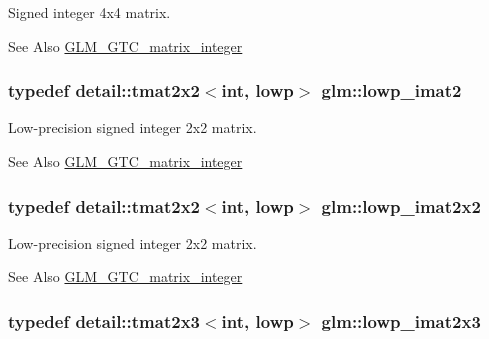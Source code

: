 Signed integer 4x4 matrix. \begin{DoxySeeAlso}{See Also}
\hyperlink{group__gtc__matrix__integer}{G\-L\-M\-\_\-\-G\-T\-C\-\_\-matrix\-\_\-integer} 
\end{DoxySeeAlso}
\hypertarget{group__gtc__matrix__integer_gae0df4bc278c1a958a32af9ac82c47630}{
\subsubsection[{lowp\-\_\-imat2}]{\setlength{\rightskip}{0pt plus 5cm}typedef detail\-::tmat2x2$<$int, lowp$>$ {\bf glm\-::lowp\-\_\-imat2}}}\label{group__gtc__matrix__integer_gae0df4bc278c1a958a32af9ac82c47630}
Low-\/precision signed integer 2x2 matrix. \begin{DoxySeeAlso}{See Also}
\hyperlink{group__gtc__matrix__integer}{G\-L\-M\-\_\-\-G\-T\-C\-\_\-matrix\-\_\-integer} 
\end{DoxySeeAlso}
\hypertarget{group__gtc__matrix__integer_ga05307630bc68a62132a82d1886a0b5e2}{
\subsubsection[{lowp\-\_\-imat2x2}]{\setlength{\rightskip}{0pt plus 5cm}typedef detail\-::tmat2x2$<$int, lowp$>$ {\bf glm\-::lowp\-\_\-imat2x2}}}\label{group__gtc__matrix__integer_ga05307630bc68a62132a82d1886a0b5e2}
Low-\/precision signed integer 2x2 matrix. \begin{DoxySeeAlso}{See Also}
\hyperlink{group__gtc__matrix__integer}{G\-L\-M\-\_\-\-G\-T\-C\-\_\-matrix\-\_\-integer} 
\end{DoxySeeAlso}
\hypertarget{group__gtc__matrix__integer_ga5757953c508a6e05bf3573d6c099cf88}{
\subsubsection[{lowp\-\_\-imat2x3}]{\setlength{\rightskip}{0pt plus 5cm}typedef detail\-::tmat2x3$<$int, lowp$>$ {\bf glm\-::lowp\-\_\-imat2x3}}}\label{group__gtc__matrix__integer_ga5757953c508a6e05bf3573d6c099cf88}
